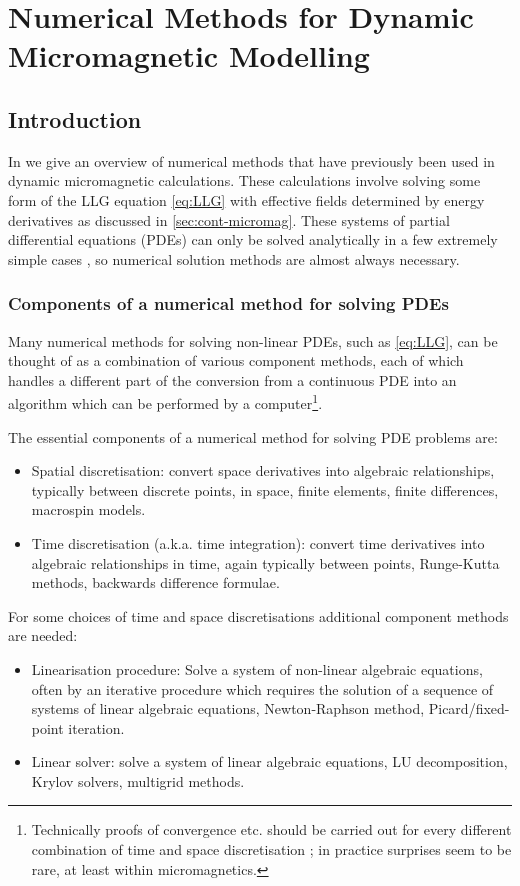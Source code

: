 \chapter{Numerical Methods for Dynamic Micromagnetic Modelling}
\label{sec:numer-meth-micr}

\section{Introduction}

In  we give an overview of numerical methods that have previously been used in dynamic micromagnetic calculations.
These calculations involve solving some form of the LLG equation \cref{eq:LLG} with effective fields determined by energy derivatives as discussed in \cref{sec:cont-micromag}.
These systems of partial differential equations (PDEs) can only be solved analytically in a few extremely simple cases \cite{Aharoni1996}, so numerical solution methods are almost always necessary.


\subsection{Components of a numerical method for solving PDEs}

Many numerical methods for solving non-linear PDEs, such as \cref{eq:LLG}, can be thought of as a combination of various component methods, each of which handles a different part of the conversion from a continuous PDE into an algorithm which can be performed by a computer\footnote{Technically proofs of convergence etc. should be carried out for every different combination of time and space discretisation \cite[382]{Iserles2009}; in practice surprises seem to be rare, at least within micromagnetics.}.

The essential components of a numerical method for solving PDE problems are:
\begin{itemize}
\item Spatial discretisation: convert space derivatives into algebraic relationships, typically between discrete points, in space, \eg finite elements, finite differences, macrospin models.
\item Time discretisation (a.k.a. time integration):  convert time derivatives into algebraic relationships in time, again typically between points, \eg Runge-Kutta methods, backwards difference formulae.
\end{itemize}
For some choices of time and space discretisations additional component methods are needed:
\begin{itemize}
\item Linearisation procedure: Solve a system of non-linear algebraic equations, often by an iterative procedure which requires the solution of a sequence of systems of linear algebraic equations, \eg Newton-Raphson method, Picard/fixed-point iteration.
\item Linear solver: solve a system of linear algebraic equations, \eg LU decomposition, Krylov solvers, multigrid methods.
\end{itemize}

